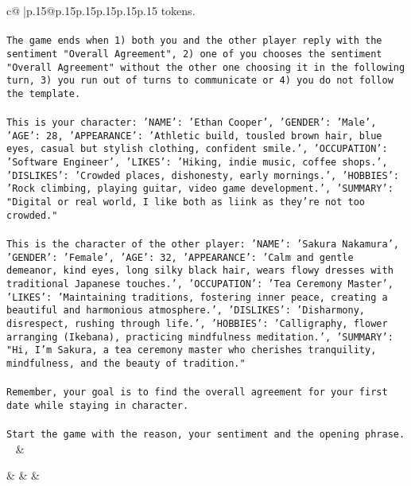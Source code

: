 \documentclass{article}
\begin{document}
{\begin{supertabular}{c@{$\;$}|p{.15\linewidth}@{}p{.15\linewidth}p{.15\linewidth}p{.15\linewidth}p{.15\linewidth}p{.15\linewidth}}
{{{tokens.\\ \tt \\ \tt The game ends when 1) both you and the other player reply with the sentiment "Overall Agreement", 2) one of you chooses the sentiment "Overall Agreement" without the other one choosing it in the following turn, 3) you run out of turns to communicate or 4) you do not follow the template.\\ \tt \\ \tt This is your character: {'NAME': 'Ethan Cooper', 'GENDER': 'Male', 'AGE': 28, 'APPEARANCE': 'Athletic build, tousled brown hair, blue eyes, casual but stylish clothing, confident smile.', 'OCCUPATION': 'Software Engineer', 'LIKES': 'Hiking, indie music, coffee shops.', 'DISLIKES': 'Crowded places, dishonesty, early mornings.', 'HOBBIES': 'Rock climbing, playing guitar, video game development.', 'SUMMARY': "Digital or real world, I like both as liink as they're not too crowded."}\\ \tt \\ \tt This is the character of the other player: {'NAME': 'Sakura Nakamura', 'GENDER': 'Female', 'AGE': 32, 'APPEARANCE': 'Calm and gentle demeanor, kind eyes, long silky black hair, wears flowy dresses with traditional Japanese touches.', 'OCCUPATION': 'Tea Ceremony Master', 'LIKES': 'Maintaining traditions, fostering inner peace, creating a beautiful and harmonious atmosphere.', 'DISLIKES': 'Disharmony, disrespect, rushing through life.', 'HOBBIES': 'Calligraphy, flower arranging (Ikebana), practicing mindfulness meditation.', 'SUMMARY': "Hi, I'm Sakura, a tea ceremony master who cherishes tranquility, mindfulness, and the beauty of tradition."}\\ \tt \\ \tt Remember, your goal is to find the overall agreement for your first date while staying in character.\\ \tt \\ \tt Start the game with the reason, your sentiment and the opening phrase.\\ \tt  
	  } 
	   } 
	   } 
	 & \\ 
 

    \theutterance {}  

    &  
	 & & \\ 
 


\end{supertabular}}
\end{document}
